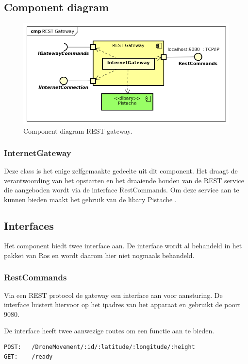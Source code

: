 \documentclass[a4paper, 11pt, oneside]{report}
\begin{document}
\subsection{Component diagram}
\label{DetailedDesign:RESTgateway:component}

\begin{figure}[H]
	\begin{center}\includegraphics[width=.6\linewidth]{Afbeeldingen/RESTgatewayComponentDiagram.png}\end{center}
	\caption{Component diagram REST gateway.}
	\label{fig:component:RESTgateway}
\end{figure}

\subsubsection{InternetGateway}
Deze class is het enige zelfgemaakte gedeelte uit dit component. 
Het draagt de verantwoording van het opstarten en het draaiende houden van de REST service die aangeboden wordt via de interface RestCommands.
Om deze service aan te kunnen bieden maakt het gebruik van de libary Pistache \cite{pisrest}.

\subsection{Interfaces}
Het component biedt twee interface aan. 
De interface  wordt al behandeld in het pakket van Ros en wordt daarom hier niet nogmaals behandeld.
\subsubsection{RestCommands}
Via een REST protocol de gateway een interface aan voor aansturing.
De interface luistert hiervoor op het ipadres van het apparaat en gebruikt de poort 9080.

De interface heeft twee aanwezige routes om een functie aan te bieden.

\begin{lstlisting}
POST:	/DroneMovement/:id/:latitude/:longitude/:height
GET:	/ready
\end{lstlisting}
\end{document}
